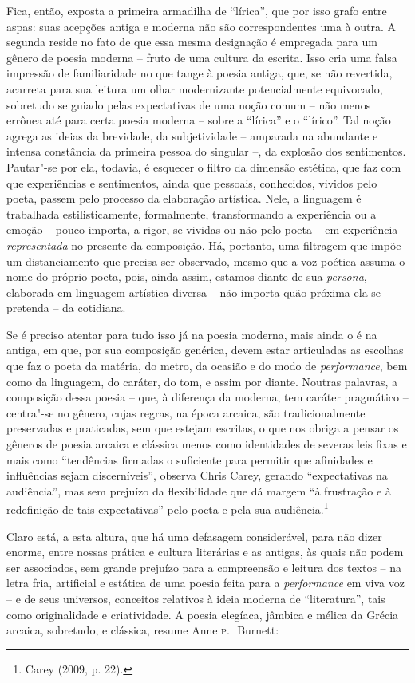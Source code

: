 Fica, então, exposta a primeira armadilha de “lírica”, que por isso grafo
entre aspas: suas acepções antiga e moderna não são correspondentes uma
à outra. A segunda reside no fato de que essa mesma designação é empregada para
um gênero de
poesia moderna -- fruto de uma cultura da escrita. Isso cria uma falsa impressão
de familiaridade no que tange à poesia antiga, que, se não revertida, acarreta
para sua leitura um olhar modernizante potencialmente equivocado, sobretudo se
guiado pelas expectativas de uma noção comum -- não menos errônea até para certa
poesia moderna -- sobre a “lírica” e o “lírico”. Tal noção agrega as ideias da
brevidade, da subjetividade -- amparada na abundante e intensa constância da
primeira pessoa do singular --, da explosão dos sentimentos. Pautar"-se por
ela, todavia, é esquecer o filtro da dimensão estética, que faz com que
experiências e sentimentos, ainda que pessoais, conhecidos, vividos pelo poeta,
passem pelo processo da elaboração artística. Nele, a linguagem é trabalhada
estilisticamente, formalmente, transformando a experiência ou a emoção -- pouco
importa, a rigor, se vividas ou não pelo poeta -- em experiência
\textit{representada} no presente da composição. Há, portanto, uma filtragem
que impõe um distanciamento que precisa ser observado, mesmo que a voz poética
assuma o nome do próprio poeta, pois, ainda assim, estamos diante de sua
\textit{persona}, elaborada em linguagem artística diversa -- não importa
quão próxima ela se pretenda -- da cotidiana.

Se é preciso atentar para tudo isso já na poesia moderna, mais ainda o é na antiga, em que, por sua composição genérica, devem
estar articuladas as escolhas que faz o poeta da matéria, do metro, da ocasião
e do modo de \textit{performance}, bem como da linguagem, do caráter, do tom, e
assim por diante. Noutras palavras, a composição dessa poesia -- que, à diferença
da moderna, tem caráter pragmático -- centra"-se no gênero, cujas regras,
na época arcaica, são tradicionalmente preservadas e praticadas, sem que
estejam escritas, o que nos obriga a pensar os gêneros de poesia arcaica e
clássica menos como identidades de severas leis fixas e mais como
“tendências firmadas o suficiente para permitir que afinidades e influências
sejam discerníveis”, observa Chris Carey, gerando
“expectativas na audiência”, mas sem prejuízo da flexibilidade que dá margem “à
frustração e à redefinição de tais expectativas” pelo poeta e pela sua
audiência.\footnote{ Carey (2009, p. 22).}

Claro está, a esta altura, que há uma defasagem considerável, para não dizer
enorme, entre nossas prática e cultura literárias e as antigas, às quais não
podem ser associados, sem grande prejuízo para a compreensão e leitura dos
textos -- na letra fria, artificial e estática de uma poesia feita para a
\textit{performance} em viva voz -- e de seus universos, conceitos relativos à
ideia moderna de “literatura”, tais como originalidade e criatividade. A poesia
elegíaca, jâmbica e mélica da Grécia arcaica, sobretudo, e clássica, resume
Anne \textsc{p}.~\,Burnett: 

